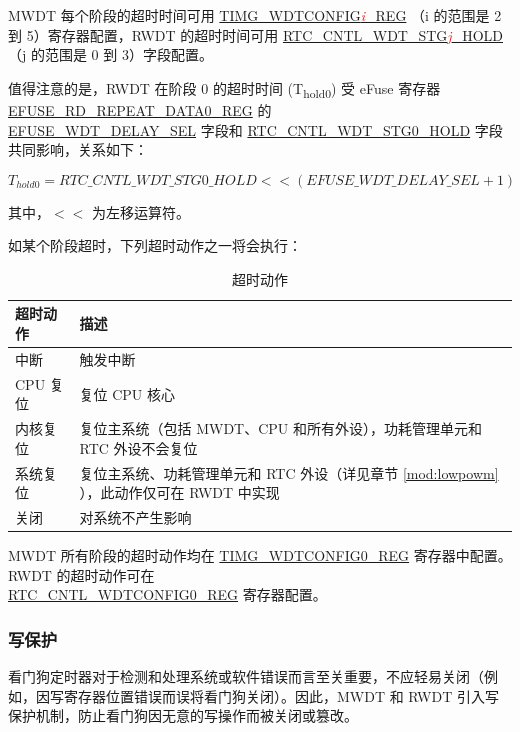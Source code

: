 \documentclass[main\_\_CN.tex]{subfiles}
\begin{document}
MWDT 每个阶段的超时时间可用 \hyperref[regdesc:TIMGWDTCONFIG2REG]{TIMG\_WDTCONFIG\textcolor{red}{\it{i}}\_REG} （i 的范围是 2 到 5）寄存器配置，RWDT 的超时时间可用 \hyperref[fielddesc:RTCCNTLWDTSTG3]{RTC\_CNTL\_WDT\_STG\textcolor{red}{\it{j}}\_HOLD}（j 的范围是 0 到 3）字段配置。

值得注意的是，RWDT 在阶段 0 的超时时间 (T\textsubscript{hold0}) 受 eFuse 寄存器 \hyperref[regdesc:EFUSERDREPEATDATA0REG]{EFUSE\_RD\_REPEAT\_DATA0\_REG} 的 \\\hyperref[fielddesc:EFUSEWDTDELAYSEL]{EFUSE\_WDT\_DELAY\_SEL} 字段和 \hyperref[fielddesc:RTCCNTLWDTSTG0HOLD]{RTC\_CNTL\_WDT\_STG0\_HOLD} 字段共同影响，关系如下：

\begin{displaymath}
T_{hold0} = \hyperref[fielddesc:RTCCNTLWDTSTG0HOLD]{RTC\_CNTL\_WDT\_STG0\_HOLD}   << (\hyperref[fielddesc:EFUSEWDTDELAYSEL]{EFUSE\_WDT\_DELAY\_SEL} + 1)
\end{displaymath}

其中，$<<$ 为左移运算符。

如某个阶段超时，下列超时动作之一将会执行：


\begin{table}[H]
\centering
\caption{超时动作}
\label{tab:wdt-timeout-action}

\begin{tabular}{|l|m{12cm}|}
\hline
\rowcolor{lightgray}
    \textbf{超时动作} & \textbf{描述} \\\hline

    中断 &  触发中断 \\ \hline
    CPU 复位 &  复位 CPU 核心 \\ \hline
    内核复位 &  复位主系统（包括 MWDT、CPU 和所有外设），功耗管理单元和 RTC 外设不会复位\\ \hline
    系统复位 &  复位主系统、功耗管理单元和 RTC 外设（详见章节 \ref{mod:lowpowm} \textit{\nameref{mod:lowpowm}}），此动作仅可在 RWDT 中实现 \\ \hline
    关闭 &  对系统不产生影响\\ \hline

\end{tabular}
\end{table}

MWDT 所有阶段的超时动作均在 \hyperref[regdesc:TIMGWDTCONFIG0REG]{TIMG\_WDTCONFIG0\_REG} 寄存器中配置。RWDT 的超时动作可在\\ \hyperref[regdesc:RTCCNTLWDTCONFIG0REG]{RTC\_CNTL\_WDTCONFIG0\_REG} 寄存器配置。

\subsubsection{写保护}
看门狗定时器对于检测和处理系统或软件错误而言至关重要，不应轻易关闭（例如，因写寄存器位置错误而误将看门狗关闭）。因此，MWDT 和 RWDT 引入写保护机制，防止看门狗因无意的写操作而被关闭或篡改。
\end{document}
